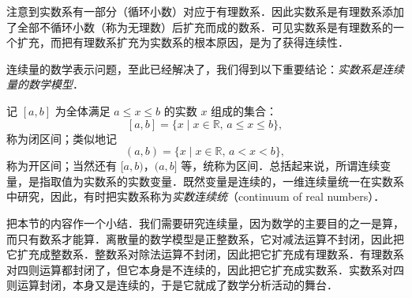 注意到实数系有一部分（循环小数）对应于有理数系．因此实数系是有理数系添加了全部不循环小数（称为无理数）后扩充而成的数系．可见实数系是有理数系的一个扩充，而把有理数系扩充为实数系的根本原因，是为了获得连续性．

连续量的数学表示问题，至此已经解决了，我们得到以下重要结论：\emph{实数系是连续量的数学模型}．

记 $[a,b]$ 为全体满足 $a\leqslant x\leqslant b$ 的实数 $x$ 组成的集合：
\[
[a,b] = \{x\mid x\in\mathbb{R},\, a\leqslant x\leqslant b\},
\]
称为闭区间；类似地记
\[
(a,b) = \{x\mid x\in\mathbb{R},\, a<x<b\},
\]
称为开区间；当然还有 $[a,b)$，$(a,b]$ 等，统称为区间．总括起来说，所谓连续变量，是指取值为实数系的实数变量．既然变量是连续的，一维连续量统一在实数系中研究，因此，有时把实数系称为\emph{实数连续统}（continuum of real numbers）．

把本节的内容作一个小结．我们需要研究连续量，因为数学的主要目的之一是算，而只有数系才能算．离散量的数学模型是正整数系，它对减法运算不封闭，因此把它扩充成整数系．整数系对除法运算不封闭，因此把它扩充成有理数系．有理数系对四则运算都封闭了，但它本身是不连续的，因此把它扩充成实数系．实数系对四则运算封闭，本身又是连续的，于是它就成了数学分析活动的舞台．
